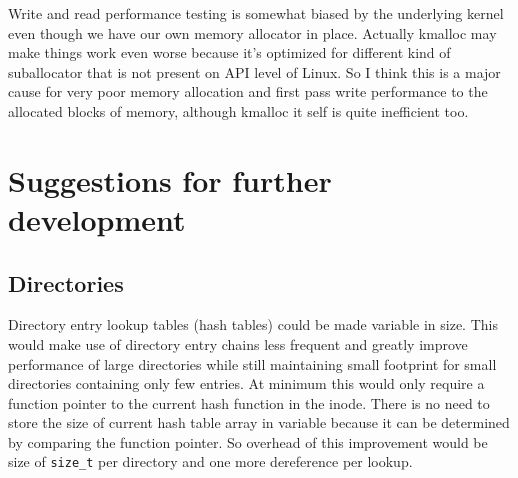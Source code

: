Write and read performance testing is somewhat biased by the underlying kernel
even though we have our own memory allocator in place. Actually kmalloc may
make things work even worse because it's optimized for different kind of
suballocator that is not present on API level of Linux. So I think this is a
major cause for very poor memory allocation and first pass write performance
to the allocated blocks of memory, although kmalloc it self is quite inefficient
too.


\section{Suggestions for further development}

\subsection{Directories}

Directory entry lookup tables (hash tables) could be made variable in size.
This would make use of directory entry chains less frequent and greatly improve
performance of large directories while still maintaining small footprint for
small directories containing only few entries. At minimum this would only
require a function pointer to the current hash function in the inode. There is
no need to store the size of current hash table array in variable because it can
be determined by comparing the function pointer. So overhead of this improvement
would be size of \verb+size_t+ per directory and one more dereference per lookup.
